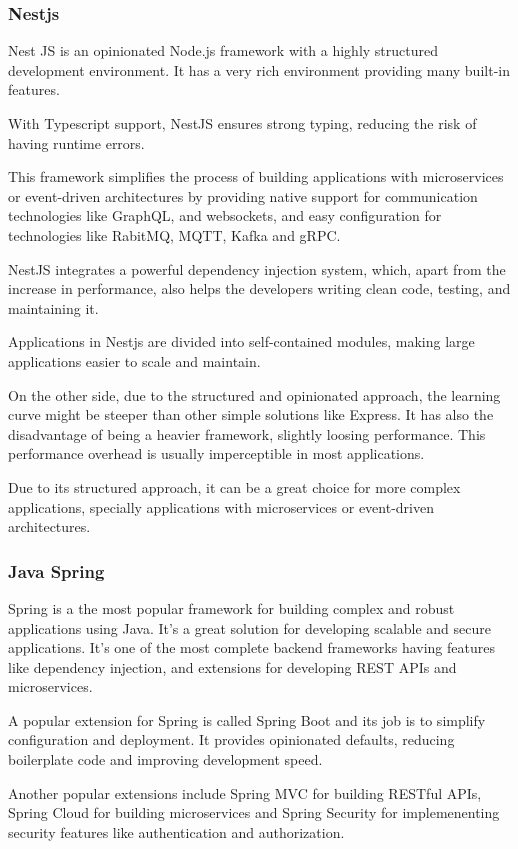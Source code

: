 \subsubsection{Nestjs}
Nest JS is an opinionated Node.js framework with a highly structured
development environment. It has a very rich environment providing many built-in
features.

With Typescript support, NestJS ensures strong typing, reducing the risk of
having runtime errors.

This framework simplifies the process of building applications with
microservices or event-driven architectures by providing native support for
communication technologies like GraphQL, and websockets, and easy configuration
for technologies like RabitMQ, \gls{MQTT}, Kafka and \gls{gRPC}.

NestJS integrates a powerful dependency injection system, which, apart from the
increase in performance, also helps the developers writing clean code, testing,
and maintaining it.

Applications in Nestjs are divided into
self-contained modules, making large applications easier to scale and maintain.

On the other side, due to the structured and opinionated approach, the learning
curve might be steeper than other simple solutions like Express.
It has also the disadvantage of being a heavier framework, slightly loosing
performance. This performance overhead is usually imperceptible in most
applications.

Due to its structured approach, it can be a great choice for more complex
applications, specially applications with microservices or event-driven
architectures.
\subsubsection{Java Spring}
Spring is a the most popular framework for building complex and robust
applications using Java. It's a great solution for developing scalable and secure
applications. It's one of the most complete backend frameworks having features
like dependency injection, and extensions for developing \gls{REST} \gls{API}s and
microservices.

A popular extension for Spring is called Spring Boot and its job is to
simplify configuration and deployment. It provides opinionated defaults,
reducing boilerplate code and improving development speed.

Another popular extensions include Spring \gls{MVC} for building \gls{REST}ful \gls{API}s, Spring
Cloud for building microservices and Spring Security for implemenenting
security features like authentication and authorization.

